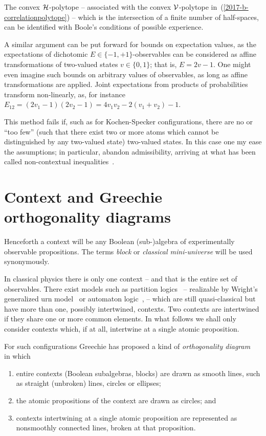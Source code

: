\documentclass[%
  twocolumn,
 showpacs,
 showkeys,
 preprintnumbers,
 amsmath,amssymb,
 aps,
  pra,
  longbibliography,
 floatfix,
 ]{revtex4-1}
\begin{document}
The convex ${\cal H}$-polytope -- associated with the convex ${\cal V}$-polytope in~(\ref{2017-b-correlationpolytope}) --
which is the intersection of a finite number of half-spaces,  can be identified with Boole's conditions of possible
experience.


A similar argument can be put forward for bounds on expectation values, as
the expectations of dichotomic $E   \in \{-1,+1\}$-observables can be considered as affine transformations
of two-valued states $v  \in \{0,1\}$; that is, $E = 2 v - 1$.
One might even imagine such bounds on arbitrary values of observables, as long as affine transformations are applied.
Joint expectations from products of probabilities transform non-linearly, as,
for instance  $E_{12}= (2v_1-1)(2v_2-1)= 4 v_1v_2 - 2(v_1+v_2)-1$.

This method fails if, such as for  Kochen-Specker configurations, there are no or ``too few''
(such that there exist two or more atoms which cannot be distinguished by any two-valued state)
two-valued states.
In this case one my ease the assumptions; in particular, abandon admissibility, arriving at what has been called
non-contextual inequalities~\cite{cabello:210401}.

\section{Context and Greechie orthogonality diagrams}
\label{2017-b-cagod}

Henceforth a context will be any Boolean (sub-)algebra of experimentally observable propositions.
The terms {\em block} or {\em classical mini-universe} will be used synonymously.

In classical physics there is only one context -- and that is the entire set of observables.
There exist models such as partition logics~\cite{dvur-pul-svo,svozil-2001-eua,svozil-2008-ql}
-- realizable by Wright's generalized urn model~\cite{wright} or automaton logic~\cite{schaller-92,svozil-93,schaller-95,schaller-96},
-- which are still quasi-classical but have more than one, possibly intertwined, contexts.
Two contexts are intertwined if they share one or more common elements.
In what follows we shall only consider contexts which, if at all, intertwine at a single atomic proposition.

For such configurations Greechie has proposed a kind of {\em orthogonality diagram}~\cite{greechie:71,kalmbach-83,svozil-tkadlec}
in which
\begin{enumerate}
\item
entire contexts (Boolean subalgebras, blocks) are drawn as smooth lines, such as straight (unbroken) lines, circles or ellipses;
\item
the atomic propositions of the context are drawn as circles; and
\item
contexts intertwining at a single atomic proposition are represented as nonsmoothly connected lines, broken at that proposition.
\end{enumerate}
\end{document}
